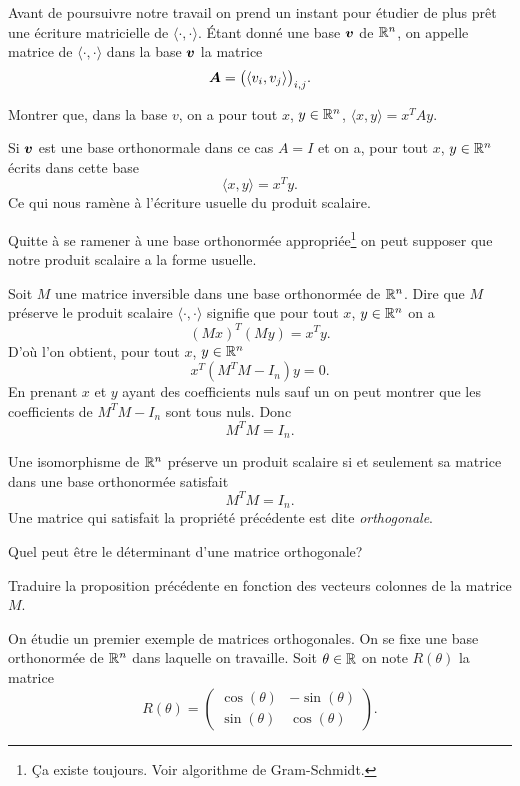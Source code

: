 \documentclass[11pt, a4paper]{article}
\begin{document}
Avant de poursuivre notre travail on prend un instant pour étudier de
plus prêt une écriture matricielle de $\langle \cdot, \cdot \rangle$.
Étant donné une base $\boldsymbol{v}$ de $\mathbb{R}^n$, on appelle matrice de
$\langle \cdot, \cdot \rangle$ dans la base $\boldsymbol{v}$ la matrice
\[
\boldsymbol{A} = \big(\langle v_i, v_j \rangle\big)_{i, j}.
\]
\begin{question}
  Montrer que, dans la base $v$, on a pour tout $x$, $y \in \mathbb{R}^n$,
  $\langle x, y \rangle = x^TAy$.
\end{question}
Si $\boldsymbol{v}$ est une base orthonormale dans ce cas $A = I$ et on a,
pour tout $x$, $ y \in \mathbb{R}^n$ écrits dans cette base
\[
\langle x, y \rangle = x^Ty.
\]
Ce qui nous ramène à l'écriture usuelle du produit scalaire.
\begin{hyp}
  Quitte à se ramener à une base orthonormée
  appropriée\footnote{\c{C}a existe toujours. Voir algorithme de
    Gram-Schmidt.} on peut supposer que notre produit scalaire a la
  forme usuelle.
\end{hyp}
Soit $M$ une matrice inversible dans une base orthonormée de
$\mathbb{R}^n$. Dire que $M$ préserve le produit scalaire
$\langle \cdot, \cdot \rangle$ signifie que pour tout $x$,
$y \in \mathbb{R}^n$ on a
\[
(Mx)^T(My) = x^Ty.
\]
D'où l'on obtient, pour tout $x$, $y \in \mathbb{R}^n$
\[
x^T\left(M^TM - I_n\right)y = 0.
\]
En prenant $x$ et $y$ ayant des coefficients nuls sauf un on peut
montrer que les coefficients de $M^TM - I_n$ sont tous nuls. Donc
\[
M^TM = I_n.
\]
\begin{prop}
  Une isomorphisme de $\mathbb{R}^n$ préserve un produit scalaire si et
  seulement sa matrice dans une base orthonormée satisfait
  \[
  M^TM = I_n.
  \]
  Une matrice qui satisfait la propriété précédente est dite
  \emph{orthogonale}.
\end{prop}
\begin{question}
  Quel peut être le déterminant d'une matrice orthogonale?
\end{question}
\begin{question}
  Traduire la proposition précédente en fonction des vecteurs colonnes
  de la matrice $M$.
\end{question}
\noindent On étudie un premier exemple de matrices orthogonales. On se
fixe une base orthonormée de $\mathbb{R}^n$ dans laquelle on travaille. Soit
$\theta \in \mathbb{R}$ on note $R(\theta)$ la matrice
\[
R(\theta) =
\begin{pmatrix}
  \cos(\theta) & - \sin(\theta) \\
  \sin(\theta) & \cos(\theta)
\end{pmatrix}.
\]
\end{document}
